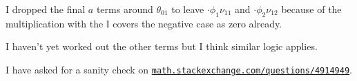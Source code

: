 \documentclass{article}
\begin{document}
I dropped the final $a$ terms around $\theta_{01}$ to leave $ \cdot \phi_{1}\nu_{11}$ and $ \cdot \phi_{2}\nu_{12}$ because of the multiplication with the $\mathbb{I}$ covers the negative case as zero already.

I haven't yet worked out the other terms but I think similar logic applies.

I have asked for a sanity check on \href{https://math.stackexchange.com/questions/4914949/}{\texttt{math.stackexchange.com/questions/4914949}}.
\end{document}

